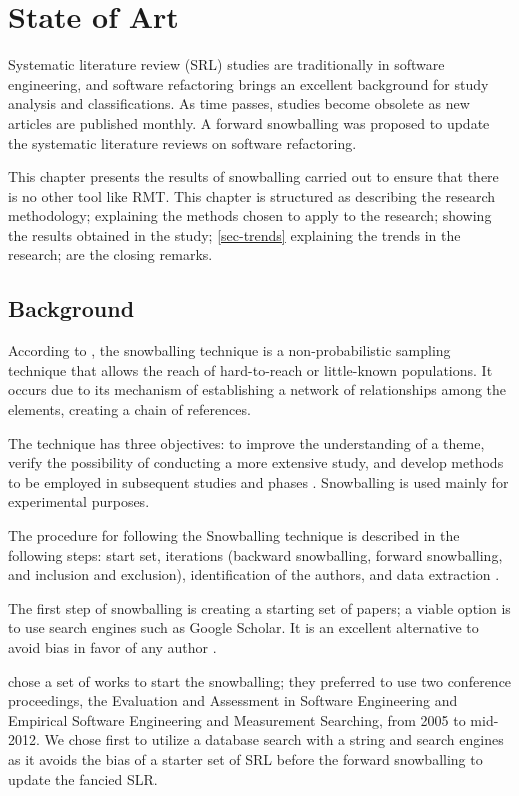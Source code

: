 \chapter{State of Art}%
\label{chap-state}

Systematic literature review (SRL) studies are traditionally in software engineering, and software refactoring brings an excellent background for study analysis and classifications. As time passes, studies become obsolete as new articles are published monthly. A forward snowballing was proposed to update the systematic literature reviews on software refactoring.

This chapter presents the results of snowballing carried out to ensure that there is no other tool like RMT. This chapter is structured as  describing the research methodology;  explaining the methods chosen to apply to the research;  showing the results obtained in the study; \cref{sec-trends} explaining the trends in the research;  are the closing remarks.

\section{Background}
\label{sec-background}
According to \cite{bernard2006}, the snowballing technique is a non-probabilistic sampling technique that allows the reach of hard-to-reach or little-known populations. It occurs due to its mechanism of establishing a network of relationships among the elements, creating a chain of references.

The technique has three objectives: to improve the understanding of a theme, verify the possibility of conducting a more extensive study, and develop methods to be employed in subsequent studies and phases \cite{vinuto2014}. Snowballing is used mainly for experimental purposes.

The procedure for following the Snowballing technique is described in the following steps: start set, iterations (backward snowballing, forward snowballing, and inclusion and exclusion), identification of the authors, and data extraction \cite{Wohlin2014}.

The first step of snowballing is creating a starting set of papers; a viable option is to use search engines such as Google Scholar. It is an excellent alternative to avoid bias in favor of any author \cite{Wohlin2014}.

\textcite{Kitchenham2013} chose a set of works to start the snowballing; they preferred to use two conference proceedings, the Evaluation and Assessment in Software Engineering and Empirical Software Engineering and Measurement Searching, from 2005 to mid-2012. We chose first to utilize a database search with a string and search engines as it avoids the bias of a starter set of SRL before the forward snowballing to update the fancied SLR.

